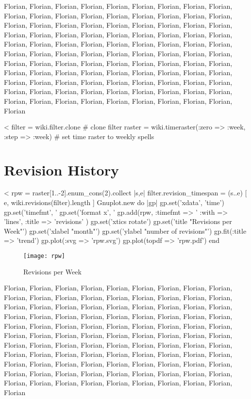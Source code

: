 \documentclass{scrartcl}
\begin{document}
Florian, Florian, Florian, Florian, Florian, Florian, Florian, Florian, Florian, Florian, Florian, Florian, Florian, Florian, Florian, Florian, Florian, Florian, Florian, Florian, Florian, Florian, Florian, Florian, Florian, Florian, Florian, Florian, Florian, Florian, Florian, Florian, Florian, Florian, Florian, Florian, Florian, Florian, Florian, Florian, Florian, Florian, Florian, Florian, Florian, Florian, Florian, Florian, Florian, Florian, Florian, Florian, Florian, Florian, Florian, Florian, Florian, Florian, Florian, Florian, Florian, Florian, Florian, Florian, Florian, Florian, Florian, Florian, Florian, Florian, Florian, Florian, Florian, Florian, Florian, Florian, Florian, Florian, Florian, Florian, Florian, Florian, Florian, Florian, Florian, Florian, Florian, Florian, Florian, Florian, Florian, Florian, Florian, Florian, Florian, Florian, Florian, Florian, Florian, Florian


<%
filter = wiki.filter.clone # clone filter
raster = wiki.timeraster(:zero => :week, :step => :week) # set time raster to weekly spells

\section{Revision History} %
\label{sec:revision_history}

<%
rpw = raster[1..-2].enum_cons(2).collect { |s,e| 
	filter.revision_timespan = (s..e)
	[ e, wiki.revisions(filter).length ]
	}
Gnuplot.new do |gp|
	gp.set('xdata', 'time')
	gp.set('timefmt', '%
	gp.set('format x', '%
	gp.add(rpw, :timefmt => '%
		:with => 'lines', 
		:title => 'revisions' )
	gp.set('xtics rotate')
	gp.set('title "Revisions per Week"')
	gp.set('xlabel "month"')
	gp.set('ylabel "number of revisions"')
	gp.fit(:title => 'trend')
	gp.plot(:svg => 'rpw.svg')
	gp.plot(topdf => 'rpw.pdf')
end
\begin{figure}[htbp]
	\centering
	\texttt{[image: rpw]}
	\caption{Revisions per Week}
	\label{fig:revisions_per_week}
\end{figure}

Florian, Florian, Florian, Florian, Florian, Florian, Florian, Florian, Florian, Florian, Florian, Florian, Florian, Florian, Florian, Florian, Florian, Florian, Florian, Florian, Florian, Florian, Florian, Florian, Florian, Florian, Florian, Florian, Florian, Florian, Florian, Florian, Florian, Florian, Florian, Florian, Florian, Florian, Florian, Florian, Florian, Florian, Florian, Florian, Florian, Florian, Florian, Florian, Florian, Florian, Florian, Florian, Florian, Florian, Florian, Florian, Florian, Florian, Florian, Florian, Florian, Florian, Florian, Florian, Florian, Florian, Florian, Florian, Florian, Florian, Florian, Florian, Florian, Florian, Florian, Florian, Florian, Florian, Florian, Florian, Florian, Florian, Florian, Florian, Florian, Florian, Florian, Florian, Florian, Florian, Florian, Florian, Florian, Florian, Florian, Florian, Florian, Florian, Florian, Florian
\end{document}
